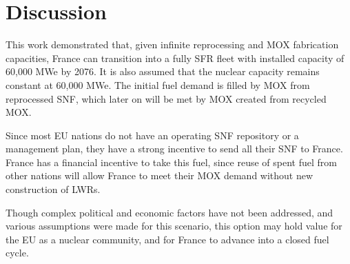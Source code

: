 \section{Discussion}
This work demonstrated that, given infinite
reprocessing and \gls{MOX} fabrication capacities,
France can transition into a fully \gls{SFR} fleet
with installed capacity of 60,000 MWe by 2076.
It is also assumed that the nuclear capacity remains
constant at 60,000 MWe.
The initial fuel demand is filled by \gls{MOX} from
reprocessed \gls{SNF}, which later on
will be met by \gls{MOX} created from recycled \gls{MOX}.

Since most EU nations do not have an operating \gls{SNF}
repository or a management plan, they have a strong incentive
to send all their \gls{SNF} to France. France has a financial
incentive to take this fuel, since reuse of spent fuel from
other nations will allow France to meet their MOX demand
without new construction of \glspl{LWR}.

Though complex political and economic factors have not been
addressed, and various assumptions were made for this scenario,
this option may hold value for the EU as a nuclear community,
and for France to advance into a closed fuel cycle.